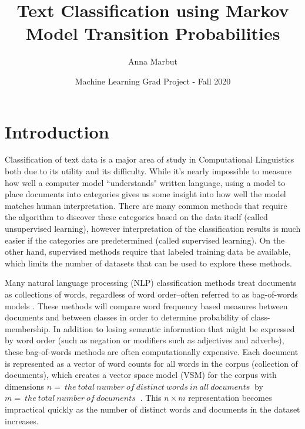 \documentclass{article}
\begin{document}
\title{Text Classification using Markov Model Transition Probabilities}
\author{Anna Marbut}
\date{Machine Learning Grad Project - Fall 2020}


\maketitle

\section{Introduction}
Classification of text data is a major area of study in Computational Linguistics both due to its utility and its difficulty. While it's nearly impossible to measure how well a computer model ``understands" written language, using a model to place documents into categories gives us some insight into how well the model matches human interpretation. There are many common methods that require the algorithm to discover these categories based on the data itself (called unsupervised learning), however interpretation of the classification results is much easier if the categories are predetermined (called supervised learning). On the other hand, supervised methods require that labeled training data be available, which limits the number of datasets that can be used to explore these methods.

Many natural language processing (NLP) classification methods treat documents as collections of words, regardless of word order--often referred to as bag-of-words models \cite{tidytext}. These methods will compare word frequency based measures between documents and between classes in order to determine probability of class-membership. In addition to losing semantic information that might be expressed by word order (such as negation or modifiers such as adjectives and adverbs), these bag-of-words methods are often computationally expensive. Each document is represented as a vector of word counts for all words in the corpus (collection of documents), which creates a vector space model (VSM) for the corpus with dimensions $n =\ the\ total\ number\ of\ distinct\ words\ in\ all\ documents\ $ by $m =\ the\ total\ number\ of\ documents\ $ \cite{bagOfWords}. This $n \times m$ representation becomes impractical quickly as the number of distinct words and documents in the dataset increases.
\end{document}
